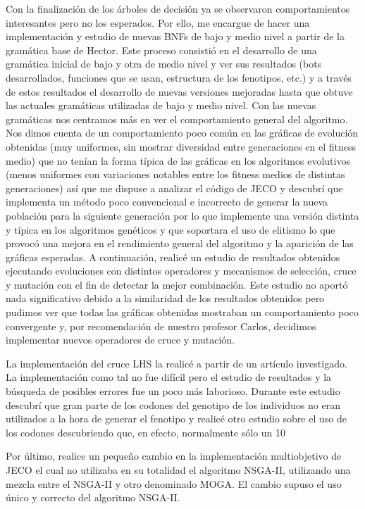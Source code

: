 Con la finalización de los árboles de decisión ya se observaron comportamientos interesantes pero no los esperados. Por ello, me encargue de hacer una implementación y estudio de nuevas BNFs de bajo y medio nivel a partir de la gramática base de Hector. Este proceso consistió en el desarrollo de una gramática inicial de bajo y otra de medio nivel y ver sus resultados (bots desarrollados, funciones que se usan, estructura de los fenotipos, etc.) y a través de estos resultados el desarrollo de nuevas versiones mejoradas hasta que obtuve las actuales gramáticas utilizadas de bajo y medio nivel.
Con las nuevas gramáticas nos centramos más en ver el comportamiento general del algoritmo. Nos dimos cuenta de un comportamiento poco común en las gráficas de evolución obtenidas (muy uniformes, sin mostrar diversidad entre generaciones en el fitness medio) que no tenían la forma típica de las gráficas en los algoritmos evolutivos (menos uniformes con variaciones notables entre los fitness medios de distintas generaciones) así que me dispuse a analizar el código de JECO y descubrí que implementa un método poco convencional e incorrecto de generar la nueva población para la siguiente generación por lo que implemente una versión distinta y típica en los algoritmos genéticos y que soportara el uso de elitismo lo que provocó una mejora en el rendimiento general del algoritmo y la aparición de las gráficas esperadas. A continuación, realicé un estudio de resultados obtenidos ejecutando evoluciones con distintos operadores y mecanismos de selección, cruce y mutación con el fin de detectar la mejor combinación. Este estudio no aportó nada significativo debido a la similaridad de los resultados obtenidos pero pudimos ver que todas las gráficas obtenidas mostraban un comportamiento poco convergente y, por recomendación de nuestro profesor Carlos, decidimos implementar nuevos operadores de cruce y mutación.

La implementación del cruce LHS la realicé a partir de un artículo investigado. La implementación como tal no fue difícil pero el estudio de resultados y la búsqueda de posibles errores fue un poco más laborioso. Durante este estudio descubrí que gran parte de los codones del genotipo de los individuos no eran utilizados a la hora de generar el fenotipo y realicé otro estudio sobre el uso de los codones descubriendo que, en efecto, normalmente sólo un 10%

Por último, realice un pequeño cambio en la implementación multiobjetivo de JECO el cual no utilizaba en su totalidad el algoritmo NSGA-II, utilizando una mezcla entre el NSGA-II y otro denominado MOGA. El cambio supuso el uso único y correcto del algoritmo NSGA-II.
 
